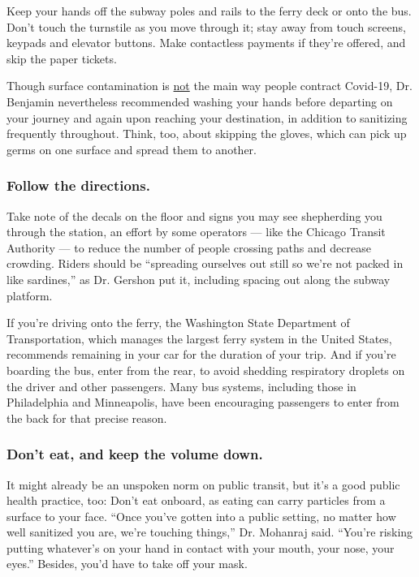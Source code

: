 Keep your hands off the subway poles and rails to the ferry deck or onto
the bus. Don't touch the turnstile as you move through it; stay away
from touch screens, keypads and elevator buttons. Make contactless
payments if they're offered, and skip the paper tickets.

Though surface contamination is
\href{https://www.nytimes.com/2020/05/22/health/cdc-coronavirus-touching-surfaces.html}{not}
the main way people contract Covid-19, Dr. Benjamin nevertheless
recommended washing your hands before departing on your journey and
again upon reaching your destination, in addition to sanitizing
frequently throughout. Think, too, about skipping the gloves, which can
pick up germs on one surface and spread them to another.

\hypertarget{follow-the-directions}{%
\subsubsection{Follow the directions.}\label{follow-the-directions}}

Take note of the decals on the floor and signs you may see shepherding
you through the station, an effort by some operators --- like the
Chicago Transit Authority --- to reduce the number of people crossing
paths and decrease crowding. Riders should be ``spreading ourselves out
still so we're not packed in like sardines,'' as Dr. Gershon put it,
including spacing out along the subway platform.

If you're driving onto the ferry, the Washington State Department of
Transportation, which manages the largest ferry system in the United
States, recommends remaining in your car for the duration of your trip.
And if you're boarding the bus, enter from the rear, to avoid shedding
respiratory droplets on the driver and other passengers. Many bus
systems, including those in Philadelphia and Minneapolis, have been
encouraging passengers to enter from the back for that precise reason.

\hypertarget{dont-eat-and-keep-the-volume-down}{%
\subsubsection{Don't eat, and keep the volume
down.}\label{dont-eat-and-keep-the-volume-down}}

It might already be an unspoken norm on public transit, but it's a good
public health practice, too: Don't eat onboard, as eating can carry
particles from a surface to your face. ``Once you've gotten into a
public setting, no matter how well sanitized you are, we're touching
things,'' Dr. Mohanraj said. ``You're risking putting whatever's on your
hand in contact with your mouth, your nose, your eyes.'' Besides, you'd
have to take off your mask.

